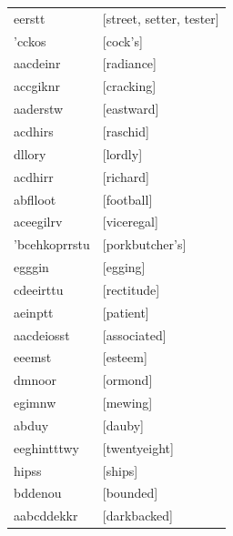 \documentclass{article}
\begin{document}
\begin{tabular}{ll}
eerstt & [street, setter, tester] \\
'cckos & [cock's] \\
aacdeinr & [radiance] \\
accgiknr & [cracking] \\
aaderstw & [eastward] \\
acdhirs & [raschid] \\
dllory & [lordly] \\
acdhirr & [richard] \\
abflloot & [football] \\
aceegilrv & [viceregal] \\
'bcehkoprrstu & [porkbutcher's] \\
egggin & [egging] \\
cdeeirttu & [rectitude] \\
aeinptt & [patient] \\
aacdeiosst & [associated] \\
eeemst & [esteem] \\
dmnoor & [ormond] \\
egimnw & [mewing] \\
abduy & [dauby] \\
eeghintttwy & [twentyeight] \\
hipss & [ships] \\
bddenou & [bounded] \\
aabcddekkr & [darkbacked] \\
\end{tabular}
\end{document}
